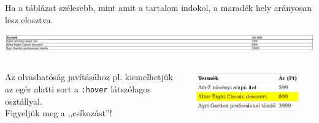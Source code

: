 \begin{frame}
  Ha a táblázat szélesebb, mint amit a tartalom indokol, a maradék hely arányosan lesz elosztva.
  \begin{exampleblock}{}
    \scriptsize
    
  \end{exampleblock}
  \begin{center}
    \includegraphics[width=\textwidth]{tablazat09.png}
  \end{center}
\end{frame}

\begin{frame}
  \begin{columns}[c]
      \small
      Az olvashatóság javításához pl. kiemelhetjük az egér alatti sort a \texttt{:hover} látszólagos osztállyal.\\
      Figyeljük meg a ,,csíkozást''!
      \vfill
      \begin{center}
        \includegraphics[width=\textwidth]{tablazat10.png}
      \end{center}
      \begin{exampleblock}{}
        \scriptsize
        
      \end{exampleblock}
  \end{columns}
\end{frame}

